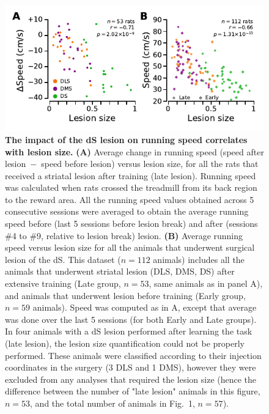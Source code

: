 \begin{figure}[h!]
  \begin{center}
    \includegraphics[scale=1]{ch-appendicies/figures/Speed.pdf}
    \caption
    {\textbf{The impact of the dS lesion on running speed correlates with lesion size.}
    \textbf{(A)} Average change in running speed (speed after lesion~$-$~speed before lesion) versus lesion size, for all the rats that received a striatal lesion after training (late lesion).
    Running speed was calculated when rats crossed the treadmill from its back region to the reward area.
    All the running speed values obtained across 5 consecutive sessions were averaged to obtain the average running speed before (last 5 sessions before lesion break) and after (sessions \#4 to \#9, relative to lesion break) lesion.
    \textbf{(B)} Average running speed versus lesion size for all the animals that underwent surgical lesion of the dS.
    This dataset ($n=112$ animals) includes all the animals that underwent striatal lesion (DLS, DMS, DS) after extensive training (Late group, $n=53$, same animals as in panel A), and animals that underwent lesion before training (Early group, $n=59$ animals).
    Speed was computed as in A, except that average was done over the last 5 sessions (for both Early and Late groups).
    In four animals with a dS lesion performed after learning the task (late lesion), the lesion size quantification could not be properly performed.
    These animals were classified according to their injection coordinates in the surgery (3 DLS and 1 DMS), however they were excluded from any analyses that required the lesion size (hence the difference between the number of "late lesion" animals in this figure, $n=53$, and the total number of animals in Fig.~1, $n=57$).
    }
    \label{fig:appendix:spd}
  \end{center}
\end{figure}